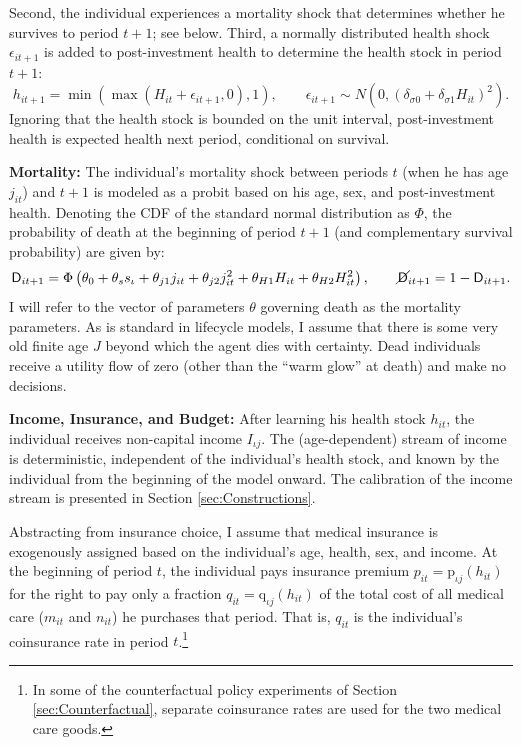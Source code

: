 \documentclass[12pt,pdftex,letterpaper]{article}
\newcommand{\Health}{h}
\newcommand{\PostHealth}{H}
\newcommand{\Inc}{I}
\newcommand{\Care}{m}
\newcommand{\Invst}{n}
\newcommand{\Premium}{p}
\newcommand{\Copay}{q}
\newcommand{\PremiumFunc}{\text{\Premium}}
\newcommand{\CopayFunc}{\text{\Copay}}
\newcommand{\HealthParam}{\delta}
\newcommand{\Sex}{s}
\newcommand{\HealthShk}{\epsilon}
\newcommand{\MortParam}{\theta}
\newcommand{\DiePrb}{\mathsf{D}}
\newcommand{\LivPrb}{\cancel{\DiePrb}}
\begin{document}
Second, the individual experiences a mortality shock that determines whether he survives to period $t+1$; see below.  Third, a normally distributed health shock $\HealthShk_{it+1}$ is added to post-investment health to determine the health stock in period $t+1$:
\begin{equation}\label{HealthNext}
\Health_{it+1} = \min(\max(\PostHealth_{it} + \HealthShk_{it+1},0),1), \qquad \HealthShk_{it+1} \sim N(0,(\HealthParam_{\sigma 0} + \HealthParam_{\sigma 1}\PostHealth_{it})^2).
\end{equation}
Ignoring that the health stock is bounded on the unit interval, post-investment health is expected health next period, conditional on survival.


\vspace{0.5cm}

\noindent \textbf{Mortality:} The individual's mortality shock between periods $t$ (when he has age $j_{it}$) and $t+1$ is modeled as a probit based on his age, sex, and post-investment health.  Denoting the CDF of the standard normal distribution as $\Phi$, the probability of death at the beginning of period $t+1$ (and complementary survival probability) are given by:
\begin{equation}\label{Mortality}
\DiePrb_{it+1} = \Phi \left( \MortParam_0 + \MortParam_{\Sex} \Sex_\iota + \MortParam_{j1} j_{it} + \MortParam_{j2} j_{it}^2 + \MortParam_{\PostHealth 1} \PostHealth_{it} + \MortParam_{\PostHealth 2} \PostHealth_{it}^2 \right), \qquad \LivPrb_{it+1} = 1 - \DiePrb_{it+1}.
\end{equation}
I will refer to the vector of parameters $\MortParam$ governing death as the mortality parameters.  As is standard in lifecycle models, I assume that there is some very old finite age $J$ beyond which the agent dies with certainty.  Dead individuals receive a utility flow of zero (other than the ``warm glow'' at death) and make no decisions.

\vspace{0.5cm}

\noindent \textbf{Income, Insurance, and Budget:} After learning his health stock $\Health_{it}$, the individual receives non-capital income $\Inc_{\iota j}$.  The (age-dependent) stream of income is deterministic, independent of the individual's health stock, and known by the individual from the beginning of the model onward.  The calibration of the income stream is presented in Section \ref{sec:Constructions}.

Abstracting from insurance choice, I assume that medical insurance is exogenously assigned based on the individual's age, health, sex, and income.  At the beginning of period $t$, the individual pays insurance premium $\Premium_{it} = \PremiumFunc_{\iota j}(\Health_{it})$ for the right to pay only a fraction $\Copay_{it} = \CopayFunc_{\iota j}(\Health_{it})$ of the total cost of all medical care ($\Care_{it}$ and $\Invst_{it}$) he purchases that period.  That is, $\Copay_{it}$ is the individual's coinsurance rate in period $t$.\footnote{In some of the counterfactual policy experiments of Section \ref{sec:Counterfactual}, separate coinsurance rates are used for the two medical care goods.}
\end{document}
